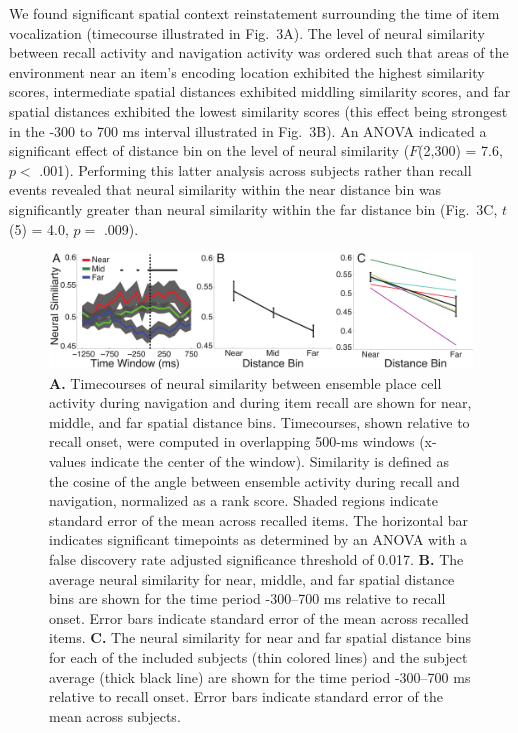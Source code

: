 We found significant spatial context reinstatement surrounding the time of item vocalization (timecourse illustrated in Fig.~3A). The level of neural similarity between recall activity and navigation activity was ordered such that areas of the environment near  an item's encoding location exhibited the highest similarity scores, intermediate spatial distances exhibited middling similarity scores, and far spatial distances exhibited the lowest similarity scores (this effect being strongest in the -300 to 700 ms interval illustrated in Fig.~3B).  An ANOVA indicated a significant effect of distance bin on the level of neural similarity ($F$(2,300) = 7.6, $p <$ .001). Performing this latter analysis across subjects rather than recall events revealed that neural similarity within the near distance bin was significantly greater than neural similarity within the far distance bin (Fig.~3C, $t$(5) = 4.0, $p =$ .009).   

\begin{figure}
\centering
  \includegraphics[width=1\textwidth]{./tex/dboy/figs/fig3}
  \caption[Timecourse of neural similarity]{\textbf{A.} Timecourses of neural similarity between ensemble place cell activity during navigation and during item recall are shown for near, middle, and far spatial distance bins.  Timecourses, shown relative to recall onset, were  computed in overlapping 500-ms windows (x-values indicate the center of the window).  Similarity is defined as the cosine of the angle between ensemble activity during recall and navigation, normalized as a rank score. Shaded regions indicate standard error of the mean across recalled items. The horizontal bar indicates significant timepoints as determined by an ANOVA with a false discovery rate adjusted significance threshold of 0.017.  \textbf{B.} The average neural similarity for near, middle, and far spatial distance bins are shown for the time period -300--700 ms relative to recall onset. Error bars indicate standard error of the mean across recalled items.  \textbf{C.} The neural similarity for near and far spatial distance bins for each of the included subjects (thin colored lines) and the subject average (thick black line) are shown for the  time period -300--700 ms relative to recall onset. Error bars indicate standard error of the mean across subjects.}
\label{fig:reinstate}
\end{figure}

